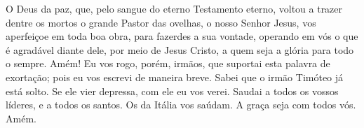 {  O Deus da paz, que, pelo sangue do eterno Testamento eterno, voltou a trazer dentre os mortos o grande Pastor das ovelhas, o nosso Senhor Jesus,
  vos aperfeiçoe em toda boa obra, para fazerdes a sua vontade, operando em vós o que é agradável diante dele, por meio de Jesus Cristo, a quem seja a glória para todo o sempre. Amém!
  Eu vos rogo, porém, irmãos, que suportai esta palavra de exortação; pois eu vos escrevi de maneira breve.
  Sabei que o irmão Timóteo já está solto. Se ele vier depressa, com ele eu vos verei.
  Saudai a todos os vossos líderes, e a todos os santos. Os da Itália vos saúdam.
  A graça seja com todos vós. Amém.{}
\par }

